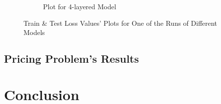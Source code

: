 \documentclass[12pt]{article}
\begin{document}
\begin{figure}[h]
\begin{subfigure}{.49\textwidth}
            \caption{Plot for 4-layered Model}
            \label{fig:Plot for 4-layered Model}
        \end{subfigure}
        \caption{Train \& Test Loss Values' Plots for One of the Runs of Different Models}
        \label{fig:Train & Test Loss Values' Plots of Different Models}
    \end{figure}
    
    \subsection{Pricing Problem's Results}
    \section{Conclusion} \label{sec:Conclusion}
    
    \blindtext
    
    
    
    \cleardoublepage
    
\end{document}
